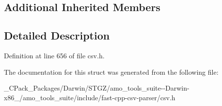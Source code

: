 \subsection*{Additional Inherited Members}


\subsection{Detailed Description}


Definition at line 656 of file csv.\+h.



The documentation for this struct was generated from the following file\+:\begin{DoxyCompactItemize}
\item 
\+\_\+\+C\+Pack\+\_\+\+Packages/\+Darwin/\+S\+T\+G\+Z/amo\+\_\+tools\+\_\+suite-\/-\/\+Darwin-\/x86\+\_/amo\+\_\+tools\+\_\+suite/include/fast-\/cpp-\/csv-\/parser/csv.\+h\end{DoxyCompactItemize}
